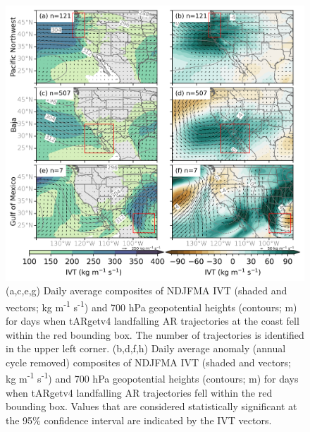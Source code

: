 \documentclass[draft]{agujournal2019}
\begin{document}
\begin{figure}
\noindent\includegraphics[width=\textwidth, height=\textheight, keepaspectratio]{fig5.png}

\caption{(a,c,e,g) Daily average composites of NDJFMA IVT (shaded and vectors; kg m\textsuperscript{-1} s\textsuperscript{-1}) and 700 hPa geopotential heights (contours; m) for days when tARgetv4 landfalling AR trajectories at the coast fell within the red bounding box. The number of trajectories is identified in the upper left corner. (b,d,f,h) Daily average anomaly (annual cycle removed) composites of NDJFMA IVT (shaded and vectors; kg m\textsuperscript{-1} s\textsuperscript{-1}) and 700 hPa geopotential heights (contours; m) for days when tARgetv4 landfalling AR trajectories fell within the red bounding box. Values that are considered statistically significant at the 95\% confidence interval are indicated by the IVT vectors.}
\label{fig:composites_NDJFMA}
\end{figure}
\end{document}
